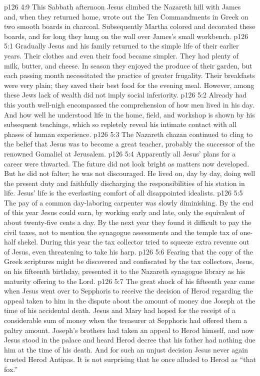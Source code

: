 \vs p126 4:9 This Sabbath afternoon Jesus climbed the Nazareth hill with James and, when they returned home, wrote out the Ten Commandments in Greek on two smooth boards in charcoal. Subsequently Martha colored and decorated these boards, and for long they hung on the wall over James’s small workbench.
\vs p126 5:1 Gradually Jesus and his family returned to the simple life of their earlier years. Their clothes and even their food became simpler. They had plenty of milk, butter, and cheese. In season they enjoyed the produce of their garden, but each passing month necessitated the practice of greater frugality. Their breakfasts were very plain; they saved their best food for the evening meal. However, among these Jews lack of wealth did not imply social inferiority.
\vs p126 5:2 Already had this youth well\hyp{}nigh encompassed the comprehension of how men lived in his day. And how well he understood life in the home, field, and workshop is shown by his subsequent teachings, which so repletely reveal his intimate contact with all phases of human experience.
\vs p126 5:3 The Nazareth chazan continued to cling to the belief that Jesus was to become a great teacher, probably the successor of the renowned Gamaliel at Jerusalem.
\pc \vs p126 5:4 Apparently all Jesus’ plans for a career were thwarted. The future did not look bright as matters now developed. But he did not falter; he was not discouraged. He lived on, day by day, doing well the present duty and faithfully discharging the  responsibilities of his station in life. Jesus’ life is the everlasting comfort of all disappointed idealists.
\vs p126 5:5 The pay of a common day\hyp{}laboring carpenter was slowly diminishing. By the end of this year Jesus could earn, by working early and late, only the equivalent of about twenty\hyp{}five cents a day. By the next year they found it difficult to pay the civil taxes, not to mention the synagogue assessments and the temple tax of one\hyp{}half shekel. During this year the tax collector tried to squeeze extra revenue out of Jesus, even threatening to take his harp.
\vs p126 5:6 Fearing that the copy of the Greek scriptures might be discovered and confiscated by the tax collectors, Jesus, on his fifteenth birthday, presented it to the Nazareth synagogue library as his maturity offering to the Lord.
\pc \vs p126 5:7 The great shock of his fifteenth year came when Jesus went over to Sepphoris to receive the decision of Herod regarding the appeal taken to him in the dispute about the amount of money due Joseph at the time of his accidental death. Jesus and Mary had hoped for the receipt of a considerable sum of money when the treasurer at Sepphoris had offered them a paltry amount. Joseph’s brothers had taken an appeal to Herod himself, and now Jesus stood in the palace and heard Herod decree that his father had nothing due him at the time of his death. And for such an unjust decision Jesus never again trusted Herod Antipas. It is not surprising that he once alluded to Herod as \textcolor{ubdarkred}{“that fox.”}
